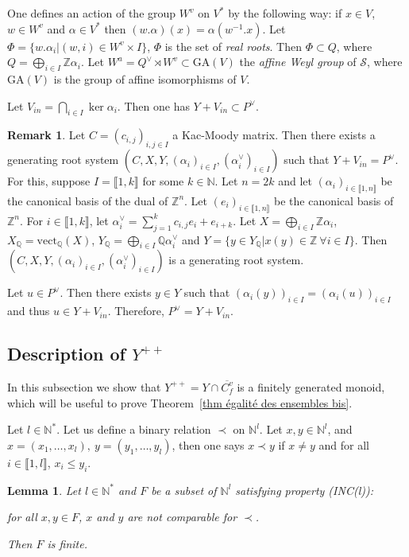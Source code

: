 \documentclass[12pt]{article}
\theoremstyle{plain}
\newtheorem{lemma}[theorem]{Lemma}
\theoremstyle{definition}
\newtheorem{rque}[theorem]{Remark}
\newcommand{\N}{\mathbb{N}}
\newcommand{\Z}{\mathbb{Z}}
\newcommand{\Q}{\mathbb{Q}}
\newcommand{\Ne}{\mathbb{N}^*}
\begin{document}
One defines an action of the group $W^v$ on $V^*$ by the following way: if $x\in V$, $w\in W^v$ and $\alpha\in V^*$ then $(w.\alpha)(x)=\alpha(w^{-1}.x)$. Let $\Phi=\{w.\alpha_i|(w,i)\in W^v\times I\}$, $\Phi$ is the set of \textit{real roots}. Then $\Phi\subset Q$, where $Q=\bigoplus_{i\in I}\Z\alpha_i$. Let $W^a=Q^\vee\rtimes W^v\subset\mathrm{GA}(V\mathrm{})$ the \textit{affine Weyl group} of $\mathcal{S}$, where $\mathrm{GA}(V\mathrm{})$ is the group of affine isomorphisms of $V$.




Let $V_{in}=\bigcap_{i\in I}\ker \alpha_i$. Then one has $Y+V_{in}\subset P^\vee$. 


\begin{rque}\label{rque changement de syst de racines}
Let $C=(c_{i,j})_{i,j\in I}$ a Kac-Moody matrix. Then there exists a generating root system $(C,X,Y,(\alpha_i)_{i\in I},(\alpha_i^\vee)_{i\in I})$ such that $Y+V_{in}=P^\vee$. For this, suppose $I=\llbracket 1,k\rrbracket$ for some $k\in \N$. Let $n=2k$ and let $(\alpha_i)_{i\in \llbracket 1,n\rrbracket }$ be the canonical basis of the dual of $\Z^n$. Let $(e_i)_{i\in \llbracket 1,n\rrbracket }$ be the canonical basis of $\Z^n$. For $i\in \llbracket 1,k\rrbracket$, let $\alpha_i^\vee=\sum_{j=1}^k c_{i,j}e_i+e_{i+k}$. Let $X=\bigoplus_{i\in I}\Z\alpha_i$, $X_\Q=\mathrm{vect}_\Q(X)$, $Y_\Q=\bigoplus_{i\in I}\Q\alpha_i^\vee$ and $Y=\{y\in Y_\Q|x(y)\in \Z\ \forall i\in I\}$. Then $(C,X,Y,(\alpha_i)_{i\in I},(\alpha_i^\vee)_{i\in I})$ is a generating root system.

Let $u\in P^\vee$. Then there exists $y\in Y$ such that $(\alpha_i(y))_{i\in I}=(\alpha_i(u))_{i\in I}$ and thus $u\in Y+V_{in}$. Therefore, $P^\vee=Y+V_{in}$.

\end{rque}



\subsection{Description of $Y^{++}$}\label{sect Y^++}

In this subsection we show that $Y^{++}=Y\cap \overline{C^v_f}$ is a finitely generated monoid, which will be useful to prove Theorem~\ref{thm égalité des ensembles bis}.



Let $l\in \Ne$. Let us define a binary relation $\prec$ on $\N^l$. Let $x,y\in \N^l$,  and $x=(x_1,\ldots,x_l),\ y=(y_1,\ldots,y_l)$, then one says $x\prec y$ if $x\neq y$ 
and for all $i\in \llbracket 1,l\rrbracket$, $x_i\leq y_i$.
\begin{lemma}\label{lemme ensembles d'incomparables}
Let $l\in \Ne$ and $F$ be a subset of $\N^l$ satisfying property (INC(l)): 

for all $x,y\in F$, $x$ and $y$ are not comparable for $\prec$. 

 Then $F$ is finite.
\end{lemma}
\end{document}

